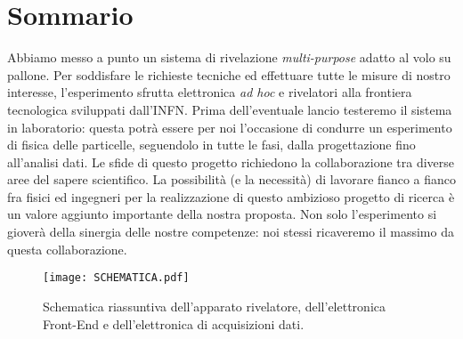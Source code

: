 \section{Sommario}

Abbiamo messo a punto un sistema di rivelazione \emph{multi-purpose} adatto al volo su pallone. Per soddisfare le richieste tecniche ed effettuare tutte le misure di nostro interesse, l'esperimento sfrutta elettronica \emph{ad hoc} e rivelatori alla frontiera tecnologica sviluppati dall'INFN. Prima dell'eventuale lancio testeremo il sistema in laboratorio: questa potrà essere per noi l'occasione di condurre un esperimento di fisica delle particelle, seguendolo in tutte le fasi, dalla progettazione fino all'analisi dati. Le sfide di questo progetto richiedono la collaborazione tra diverse aree del sapere scientifico. La possibilità (e la necessità) di lavorare fianco a fianco fra fisici ed ingegneri per la realizzazione di questo ambizioso progetto di ricerca è un valore aggiunto importante della nostra proposta. Non solo l'esperimento si gioverà della sinergia delle nostre competenze: noi stessi ricaveremo il massimo da questa collaborazione. 

\begin{figure}[h]
\centering
\texttt{[image: SCHEMATICA.pdf]}
\caption{Schematica riassuntiva dell'apparato rivelatore, dell'elettronica Front-End e dell'elettronica di acquisizioni dati.}
\label{schematica}
\end{figure}
